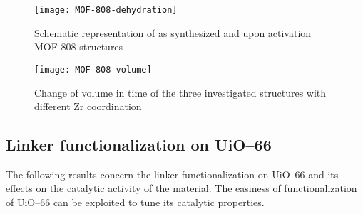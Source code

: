 \begin{figure}[!htbp]
	\centering
	\texttt{[image: MOF-808-dehydration]}
	\caption{Schematic representation of as synthesized and upon activation MOF-808 structures}
	\label{fig:MOF-808-dehydration}
\end{figure}

\begin{figure}[!htbp]
	\centering
	\texttt{[image: MOF-808-volume]}
	\caption{Change of volume in time of the three investigated structures with different Zr coordination}
	\label{fig:MOF-808-volume}
\end{figure}

\subsection{Linker functionalization on UiO--66}
The following results concern the linker functionalization on UiO--66 and its effects on the catalytic activity of the material. 
The easiness of functionalization of UiO--66 can be exploited to tune its catalytic properties. 

